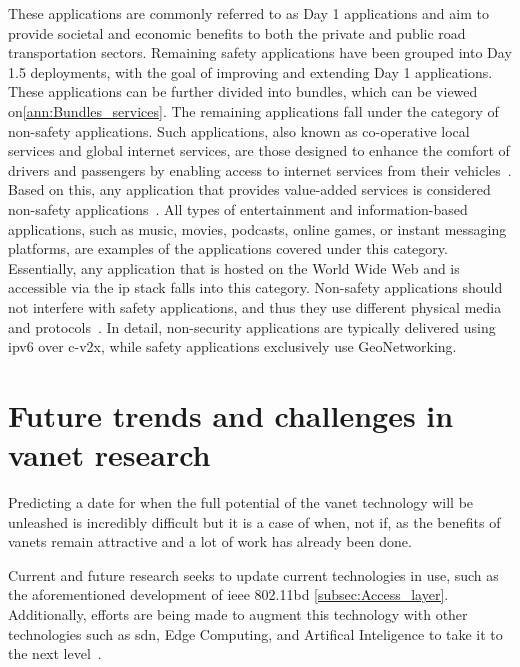 These applications are commonly referred to as Day 1 applications and aim to provide societal and economic benefits to both the private and public road transportation sectors. Remaining safety applications have been grouped into Day 1.5 deployments, with the goal of improving and extending Day 1 applications. These applications can be further divided into bundles, which can be viewed on\ref{ann:Bundles_services}.
The remaining applications fall under the category of non-safety applications. Such applications, also known as co-operative local services and global internet services, are those designed to enhance the comfort of drivers and passengers by enabling access to internet services from their vehicles~\cite{al-sultan_comprehensive_2014}. Based on this, any application that provides value-added services is considered non-safety applications~\cite{toor_vehicle_2008}.
All types of entertainment and information-based applications, such as music, movies, podcasts, online games, or instant messaging platforms, are examples of the applications covered under this category. Essentially, any application that is hosted on the World Wide Web and is accessible via the \gls{ip} stack falls into this category.
Non-safety applications should not interfere with safety applications, and thus they use different physical media and protocols~\cite{jakubiak_state_2008}. In detail, non-security applications are typically delivered using \gls{ipv6} over \gls{c-v2x}, while safety applications exclusively use GeoNetworking.


\section[Future trends and challenges in VANET research]{Future trends and challenges in \gls{vanet} research}
\label{sec:vanet_future}

Predicting a date for when the full potential of the \gls{vanet} technology will be unleashed is incredibly difficult but it is a case of when, not if, as the benefits of \glspl{vanet} remain attractive and a lot of work has already been done. 

Current and future research seeks to update current technologies in use, such as the aforementioned development of \gls{ieee} 802.11bd \ref{subsec:Access_layer}. Additionally, efforts are being made to augment this technology with other technologies such as \gls{sdn}, Edge Computing, and Artifical Inteligence to take it to the next level~\cite{mahi_review_2022}.

